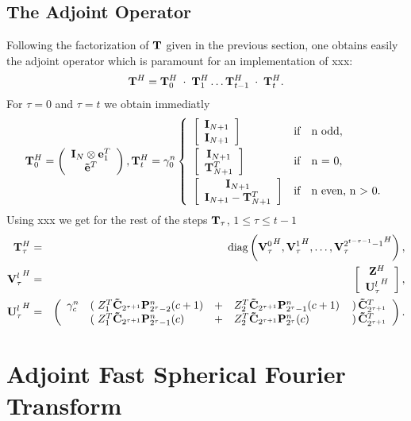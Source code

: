 \subsection{The Adjoint Operator}
Following the factorization of $\mathbf{T}$ given in the previous section, one obtains easily the adjoint operator which is paramount for an implementation of xxx: 
$$\mathbf{T}^H = \mathbf{T}_{0}^H \; \cdot \; \mathbf{T}_{1}^H \dots \mathbf{T}_{t-1}^H \; \cdot \; \mathbf{T}_{t}^H.$$ For $\tau = 0$ and $\tau = t$ we obtain immediatly
$$ \mb{T}_{0}^H = \left( \begin{array}{c} \mb{I}_{N} \otimes \mb{e}_{1}^T\\ \mb{\tilde{e}}^T \end{array}\right), \mb{T}_{t}^H = \gamma_{0}^n \left\{\begin{array}{l@{\quad \text{if} \quad}l} 
 \left[ \begin{array}{c} \mb{I}_{N+1} \\ \mb{I}_{N+1} \end{array} \right] & \text{n odd},\\[2ex]
 \left[ \begin{array}{c} \mb{I}_{N+1} \\ \mb{T}_{N+1}^T \end{array} \right] & \text{n = 0},\\[2ex]
 \left[ \begin{array}{c} \mb{I}_{N+1} \\ \mb{I}_{N+1} - \mb{T}_{N+1}^T \end{array} \right] & \text{n even, n > 0}.
\end{array}\right.$$
Using xxx we get for the rest of the steps $\mathbf{T}_{\tau}$, $1 \le \tau \le t-1$
\begin{eqnarray*}
 \mathbf{T}_{\tau}^H & = & \text{diag}\left({\mathbf{V}_{\tau}^0}^H,{\mathbf{V}_{\tau}^1}^H,\dots,{\mathbf{V}_{\tau}^{2^{t-\tau-1}-1}}^H\right),\\
 {\mathbf{V}_{\tau}^l}^H & = & \left[ \begin{array}{c} \mathbf{Z}^H \\ { \mathbf{U}_{\tau}^l}^H \end{array} \right],\\
 {\mathbf{U}_{\tau}^l}^H & = &
   \left(
     \begin{array}{rlllr}
        \gamma_{c}^n & \left(\right. Z_{1}^T \mathbf{\tilde{C}}_{2^{\tau+1}} \mathbf{P}_{2^{\tau}-2}^n(c+1)   & + & Z_{2}^T \mathbf{\tilde{C}}_{2^{\tau+1}} \mathbf{P}_{2^{\tau}-1}^n(c+1)
         & \left.\right) \mathbf{\tilde{C}}_{2^{\tau+1}}^T \\
        & \left(\right. Z_{1}^T \mathbf{\tilde{C}}_{2^{\tau+1}} \mathbf{P}_{2^{\tau}-1}^n(c) & + & Z_{2}^T \mathbf{\tilde{C}}_{2^{\tau+1}} \mathbf{P}_{2^{\tau}}^n(c) & \left.\right) \mathbf{\tilde{C}}_{2^{\tau+1}}^T
     \end{array}
   \right).
\end{eqnarray*}


\section{Adjoint Fast Spherical Fourier Transform}
\label{DSFT:AdjointTransform}